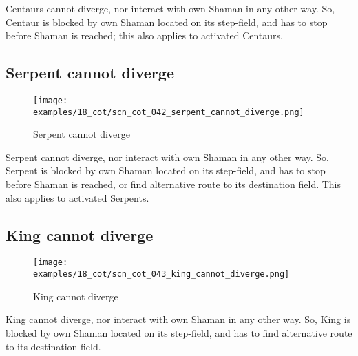 \vspace*{-0.5\baselineskip}
Centaurs cannot diverge, nor interact with own Shaman in any other way. So, Centaur
is blocked by own Shaman located on its step-field, and has to stop before Shaman
is reached; this also applies to activated Centaurs.

\clearpage %

\subsection*{Serpent cannot diverge}
\label{sec:Conquest of Tlalocan/Divergence/Serpent cannot diverge}

\vspace*{-1.4\baselineskip}
\noindent
\begin{figure}[!h]
\texttt{[image: examples/18\_cot/scn\_cot\_042\_serpent\_cannot\_diverge.png]}
\vspace*{-1.3\baselineskip}
\caption{Serpent cannot diverge}
\label{fig:scn_cot_042_serpent_cannot_diverge}
\end{figure}

\vspace*{-0.5\baselineskip}
Serpent cannot diverge, nor interact with own Shaman in any other way. So, Serpent
is blocked by own Shaman located on its step-field, and has to stop before Shaman
is reached, or find alternative route to its destination field. This also applies
to activated Serpents.


\subsection*{King cannot diverge}
\label{sec:Conquest of Tlalocan/Divergence/King cannot diverge}

\noindent
\begin{wrapfigure}[6]{l}{0.4\textwidth}
\centering
\texttt{[image: examples/18\_cot/scn\_cot\_043\_king\_cannot\_diverge.png]}
\caption{King cannot diverge}
\label{fig:scn_cot_043_king_cannot_diverge}
\end{wrapfigure}
King cannot diverge, nor interact with own Shaman in any other way. So, King is
blocked by own Shaman located on its step-field, and has to find alternative
route to its destination field.


